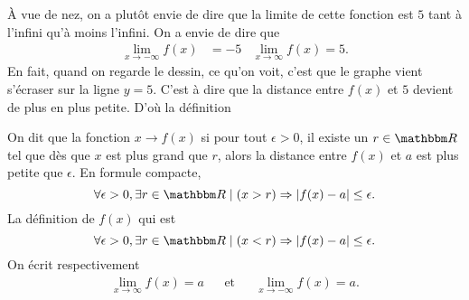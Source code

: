 À vue de nez, on a plutôt envie de dire que la limite de cette fonction est $5$ tant à l'infini qu'à moins l'infini. On a envie de dire que 
\begin{align}
\lim_{x\to -\infty}f(x)&=-5		&\lim_{x\to\infty}f(x)=5.
\end{align}
En fait, quand on regarde le dessin, ce qu'on voit, c'est que le graphe vient s'écraser sur la ligne $y=5$. C'est à dire que la distance entre $f(x)$ et $5$ devient de plus en plus petite. D'où la définition
\begin{definition}
On dit que la fonction $x\to f(x)$  si pour tout $\epsilon>0$, il existe un $r\in \eR$ tel que dès que $x$ est plus grand que $r$, alors la distance entre $f(x)$ et $a$ est plus petite que $\epsilon$. En formule compacte,
\[ 
  \forall \epsilon>0,\exists r\in\eR\tq (x>r)\Rightarrow | f(x)-a |\leq \epsilon.
\]
La définition de $f(x)$ qui  est 
\[ 
  \forall \epsilon>0,\exists r\in\eR\tq (x<r)\Rightarrow | f(x)-a |\leq \epsilon.
\]
On écrit respectivement
\begin{align}
\lim_{x\to\infty}f(x)=a&&\text{et}&&\lim_{x\to -\infty}f(x)=a.
\end{align}
\end{definition}

